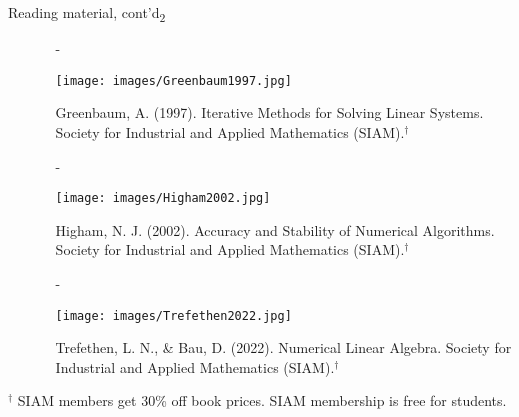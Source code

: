 \documentclass[t,usepdftitle=false]{beamer}
\begin{document}
\begin{frame}{Reading material, cont'd\textsubscript{2}}
\begin{itemize}
\item[]
\begin{itemize}
\item[-]\begin{minipage}{0.2\textwidth}\vspace{.3cm}
\texttt{[image: images/Greenbaum1997.jpg]}
\end{minipage}
\hspace{-.8cm}
\begin{minipage}{0.75\textwidth}
Greenbaum, A. (1997). Iterative Methods for Solving Linear Systems. 
Society for Industrial and Applied Mathematics (SIAM).${}^\dagger$
\end{minipage}\vspace{.3cm}
\item[-]\begin{minipage}{0.2\textwidth}\vspace{.3cm}
\texttt{[image: images/Higham2002.jpg]}
\end{minipage}
\hspace{-.8cm}
\begin{minipage}{0.75\textwidth}
Higham, N. J. (2002). Accuracy and Stability of Numerical Algorithms. 
Society for Industrial and Applied Mathematics (SIAM).${}^\dagger$
\end{minipage}\vspace{.3cm}
\item[-]\begin{minipage}{0.2\textwidth}\vspace{.3cm}
\texttt{[image: images/Trefethen2022.jpg]}
\end{minipage}
\hspace{-.8cm}
\begin{minipage}{0.75\textwidth}
Trefethen, L. N., \& Bau, D. (2022). Numerical Linear Algebra. 
Society for Industrial and Applied Mathematics (SIAM).${}^\dagger$
\end{minipage}
\end{itemize}
\end{itemize}\vspace{.1cm}
\vfill
\tiny{${}^\dagger$ SIAM members get 30\% off book prices. SIAM membership is free for students.}
\end{frame}
\end{document}
